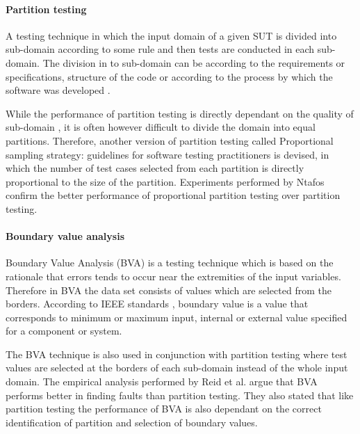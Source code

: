 \paragraph{Partition testing}
A testing technique in which the input domain of a given SUT is divided into sub-domain according to some rule and then tests are conducted in each sub-domain. The division in to sub-domain can be according to the requirements or specifications, structure of the code or according to the process by which the software was developed \cite{hamlet1990}. 

While the performance of partition testing is directly dependant on the quality of sub-domain \cite{weyuker1991analyzing}, it is often however difficult to divide the domain into equal partitions. Therefore, another version of partition testing called Proportional sampling strategy: guidelines for software testing practitioners \cite{Chan1996} is devised, in which the number of test cases selected from each partition is directly proportional to the size of the partition. Experiments performed by Ntafos \cite{ntafos1998random} confirm the better performance of proportional partition testing over partition testing.


\paragraph{Boundary value analysis}
Boundary Value Analysis (BVA) is a testing technique which is based on the rationale that errors tends to occur near the extremities of the input variables. Therefore in BVA the data set consists of values which are selected from the borders. According to IEEE standards \cite{radatz1990ieee}, boundary value is a value that corresponds to minimum or maximum input, internal or external value specified for a component or system. 

The BVA technique is also used in conjunction with partition testing where test values are selected at the borders of each sub-domain instead of the whole input domain. The empirical analysis performed by Reid et al. \cite{reid1997empirical} argue that BVA performs better in finding faults than partition testing. They also stated that like partition testing the performance of BVA is also dependant on the correct identification of partition and selection of boundary values.

